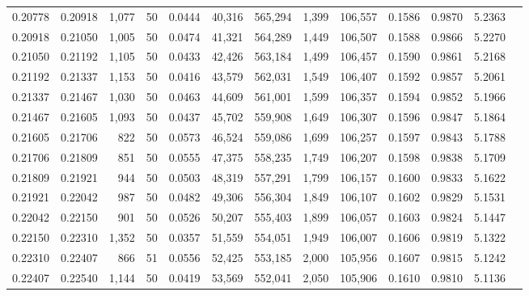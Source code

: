 \begin{tabular}{rrrrrrrrrrrrr}
0.20778 & 0.20918 & 1,077 &  50 &                                     0.0444 &  40,316 & 565,294 &   1,399 & 106,557 & 0.1586 & 0.9870 & 5.2363 \\
0.20918 & 0.21050 & 1,005 &  50 &                                     0.0474 &  41,321 & 564,289 &   1,449 & 106,507 & 0.1588 & 0.9866 & 5.2270 \\
0.21050 & 0.21192 & 1,105 &  50 &                                     0.0433 &  42,426 & 563,184 &   1,499 & 106,457 & 0.1590 & 0.9861 & 5.2168 \\
0.21192 & 0.21337 & 1,153 &  50 &                                     0.0416 &  43,579 & 562,031 &   1,549 & 106,407 & 0.1592 & 0.9857 & 5.2061 \\
0.21337 & 0.21467 & 1,030 &  50 &                                     0.0463 &  44,609 & 561,001 &   1,599 & 106,357 & 0.1594 & 0.9852 & 5.1966 \\
0.21467 & 0.21605 & 1,093 &  50 &                                     0.0437 &  45,702 & 559,908 &   1,649 & 106,307 & 0.1596 & 0.9847 & 5.1864 \\
0.21605 & 0.21706 &   822 &  50 &                                     0.0573 &  46,524 & 559,086 &   1,699 & 106,257 & 0.1597 & 0.9843 & 5.1788 \\
0.21706 & 0.21809 &   851 &  50 &                                     0.0555 &  47,375 & 558,235 &   1,749 & 106,207 & 0.1598 & 0.9838 & 5.1709 \\
0.21809 & 0.21921 &   944 &  50 &                                     0.0503 &  48,319 & 557,291 &   1,799 & 106,157 & 0.1600 & 0.9833 & 5.1622 \\
0.21921 & 0.22042 &   987 &  50 &                                     0.0482 &  49,306 & 556,304 &   1,849 & 106,107 & 0.1602 & 0.9829 & 5.1531 \\
0.22042 & 0.22150 &   901 &  50 &                                     0.0526 &  50,207 & 555,403 &   1,899 & 106,057 & 0.1603 & 0.9824 & 5.1447 \\
0.22150 & 0.22310 & 1,352 &  50 &                                     0.0357 &  51,559 & 554,051 &   1,949 & 106,007 & 0.1606 & 0.9819 & 5.1322 \\
0.22310 & 0.22407 &   866 &  51 &                                     0.0556 &  52,425 & 553,185 &   2,000 & 105,956 & 0.1607 & 0.9815 & 5.1242 \\
0.22407 & 0.22540 & 1,144 &  50 &                                     0.0419 &  53,569 & 552,041 &   2,050 & 105,906 & 0.1610 & 0.9810 & 5.1136 \\

\end{tabular}
